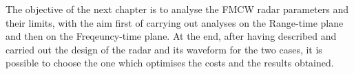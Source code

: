 The objective of the next chapter is to analyse the FMCW radar parameters and their limits, with the aim first of carrying out analyses on the Range-time plane and then on the Freqeuncy-time plane. At the end, after having described and carried out the design of the radar and its waveform for the two cases, it is possible to choose the one which optimises the costs and the results obtained. 
